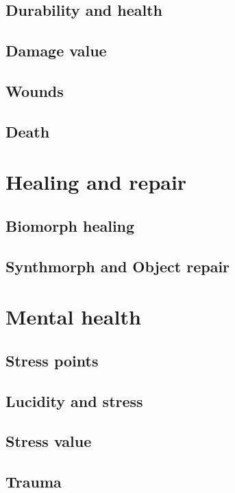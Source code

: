 \subsection{Durability and health}

\subsection{Damage value}

\subsection{Wounds}

\subsection{Death}

\section{Healing and repair}
\label{sec:healing-repair}

\subsection{Biomorph healing}

\subsection{Synthmorph and Object repair}

\section{Mental health}
\label{sec:mental-health}

\subsection{Stress points}

\subsection{Lucidity and stress}

\subsection{Stress value}

\subsection{Trauma}

